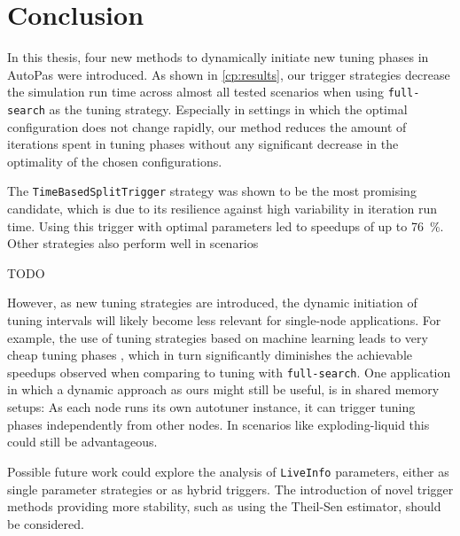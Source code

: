 \chapter[Conclusion]{Conclusion}
\label{cp:conclusion}

%

In this thesis, four new methods to dynamically initiate new tuning phases in AutoPas were introduced.
As shown in \autoref{cp:results}, our trigger strategies decrease the simulation run time across almost all tested scenarios when using \texttt{full-search} as the tuning strategy. 
Especially in settings in which the optimal configuration does not change rapidly, our method reduces the amount of iterations spent in tuning phases without any significant decrease in the optimality of the chosen configurations. %


The \texttt{TimeBasedSplitTrigger} strategy was shown to be the most promising candidate, which is due to its resilience against high variability in iteration run time. Using this trigger with optimal parameters led to speedups of up to \qty{76}{\percent}. Other strategies also perform well in scenarios \textellipsis %

TODO

However, as new tuning strategies are introduced, the dynamic initiation of tuning intervals will likely become less relevant for single-node applications. For example, the use of tuning strategies based on machine learning leads to very cheap tuning phases \cite{Newcome2025}, which in turn significantly diminishes the achievable speedups observed when comparing to tuning with \texttt{full-search}. One application in which a dynamic approach as ours might still be useful, is in shared memory setups: As each node runs its own autotuner instance, it can trigger tuning phases independently from other nodes. In scenarios like exploding-liquid this could still be advantageous.

Possible future work could explore the analysis of \texttt{LiveInfo} parameters, either as single parameter strategies or as hybrid triggers. The introduction of novel trigger methods providing more stability, such as using the Theil-Sen estimator, should be considered.
